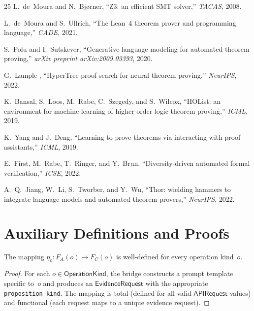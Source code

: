 \documentclass[11pt]{article}
\newcommand{\APIReq}{\mathsf{APIRequest}}
\newcommand{\OpKind}{\mathsf{OperationKind}}
\newcommand{\EvReq}{\mathsf{EvidenceRequest}}
\begin{document}
\begin{thebibliography}{25}
L.~de~Moura and N.~Bj{\o}rner,
``Z3: an efficient SMT solver,''
\emph{TACAS}, 2008.

L.~de~Moura and S.~Ullrich,
``The Lean~4 theorem prover and programming language,''
\emph{CADE}, 2021.

S.~Polu and I.~Sutskever,
``Generative language modeling for automated theorem proving,''
\emph{arXiv preprint arXiv:2009.03393}, 2020.

G.~Lample \etal{},
``HyperTree proof search for neural theorem proving,''
\emph{NeurIPS}, 2022.

K.~Bansal, S.~Loos, M.~Rabe, C.~Szegedy, and S.~Wilcox,
``HOList: an environment for machine learning of higher-order
logic theorem proving,''
\emph{ICML}, 2019.

K.~Yang and J.~Deng,
``Learning to prove theorems via interacting with proof
assistants,''
\emph{ICML}, 2019.

E.~First, M.~Rabe, T.~Ringer, and Y.~Brun,
``Diversity-driven automated formal verification,''
\emph{ICSE}, 2022.

A.~Q.~Jiang, W.~Li, S.~Tworber, and Y.~Wu,
``Thor: wielding hammers to integrate language models and
automated theorem provers,''
\emph{NeurIPS}, 2022.

\end{thebibliography}

\appendix

\section{Auxiliary Definitions and Proofs}\label{app:proofs}

\begin{lemma}%
\label{lem:bridgenatwd}
The mapping $\eta_o \colon F_A(o) \to F_C(o)$ is
well-defined for every operation kind~$o$.
\end{lemma}
\begin{proof}
For each $o \in \OpKind$, the bridge constructs a prompt
template specific to~$o$ and produces an $\EvReq$ with
the appropriate \texttt{proposition\_kind}.  The mapping
is total (defined for all valid $\APIReq$ values) and
functional (each request maps to a unique evidence request).
\end{proof}
\end{document}
